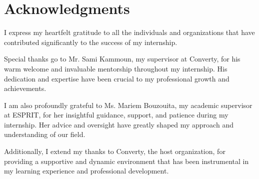 \chapter*{Acknowledgments}

I express my heartfelt gratitude to all the individuals and organizations that have contributed significantly to the success of my internship.
\newline

Special thanks go to Mr. Sami Kammoun, my supervisor at Converty, for his warm welcome and invaluable mentorship throughout my internship. His dedication and expertise have been crucial to my professional growth and achievements.
\newline

I am also profoundly grateful to Ms. Mariem Bouzouita, my academic supervisor at ESPRIT, for her insightful guidance, support, and patience during my internship. Her advice and oversight have greatly shaped my approach and understanding of our field.
\newline

Additionally, I extend my thanks to Converty, the host organization, for providing a supportive and dynamic environment that has been instrumental in my learning experience and professional development.
